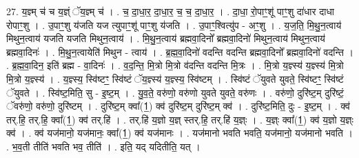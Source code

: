 \documentclass[17pt]{extarticle}
\begin{document}
27. य॒ज्ञ्म् च॑ च य॒ज्ञ्ं ॅय॒ज्ञ्म् च॑ । . च॒ दा॒धा॒र॒ दा॒धा॒र॒ च॒ च॒ दा॒धा॒र॒ । . दा॒धा॒ रो॒पाꣳ॒॒शू॑ पाꣳ॒॒शु दा॑धार दाधा रोपाꣳ॒॒शु । . उ॒पाꣳ॒॒शु य॑जति यज त्युपाꣳ॒॒शू॑ पाꣳ॒॒शु य॑जति । . उ॒पाꣳ॒॒श्वित्यु॑प - अꣳ॒॒शु । . य॒ज॒ति॒ मि॒थु॒न॒त्वाय॑ मिथुन॒त्वाय॑ यजति यजति मिथुन॒त्वाय॑ । . मि॒थु॒न॒त्वाय॑ ब्रह्मवा॒दिनो᳚ ब्रह्मवा॒दिनो॑ मिथुन॒त्वाय॑ मिथुन॒त्वाय॑ ब्रह्मवा॒दिनः॑ । . मि॒थु॒न॒त्वायेति॑ मिथुन - त्वाय॑ । . ब्र॒ह्म॒वा॒दिनो॑ वदन्ति वदन्ति ब्रह्मवा॒दिनो᳚ ब्रह्मवा॒दिनो॑ वदन्ति । . ब्र॒ह्म॒वा॒दिन॒ इति॑ ब्रह्म - वा॒दिनः॑ । . व॒द॒न्ति॒ मि॒त्रो मि॒त्रो व॑दन्ति वदन्ति मि॒त्रः । . मि॒त्रो य॒ज्ञ्स्य॑ य॒ज्ञ्स्य॑ मि॒त्रो मि॒त्रो य॒ज्ञ्स्य॑ । . य॒ज्ञ्स्य॒ स्वि॑ष्टꣳ॒॒ स्वि॑ष्टं ॅय॒ज्ञ्स्य॑ य॒ज्ञ्स्य॒ स्वि॑ष्टम् । . स्वि॑ष्टं ॅयुवते युवते॒ स्वि॑ष्टꣳ॒॒ स्वि॑ष्टं ॅयुवते । . स्वि॑ष्ट॒मिति॒ सु - इ॒ष्ट॒म् । . यु॒व॒ते॒ वरु॑णो॒ वरु॑णो युवते युवते॒ वरु॑णः । . वरु॑णो॒ दुरि॑ष्ट॒म् दुरि॑ष्टं॒ ॅवरु॑णो॒ वरु॑णो॒ दुरि॑ष्टम् । . दुरि॑ष्ट॒म् क्वा᳚(1॒) क्व॑ दुरि॑ष्ट॒म् दुरि॑ष्ट॒म् क्व॑ । . दुरि॑ष्ट॒मिति॒ दुः - इ॒ष्ट॒म् । . क्व॑ तर्.हि॒ तर्.हि॒ क्वा᳚(1॒) क्व॑ तर्.हि॑ । . तर्.हि॑ य॒ज्ञो य॒ज्ञ् स्तर्.हि॒ तर्.हि॑ य॒ज्ञ्ः । . य॒ज्ञ्ः क्वा᳚(1॒) क्व॑ य॒ज्ञो य॒ज्ञ्ः क्व॑ । . क्व॑ यज॑मानो॒ यज॑मानः॒ क्वा᳚(1॒) क्व॑ यज॑मानः । . यज॑मानो भवति भवति॒ यज॑मानो॒ यज॑मानो भवति । . भ॒व॒ती तीति॑ भवति भव॒ तीति॑ । . इति॒ यद् यदितीति॒ यत् । \newline
\end{document}
